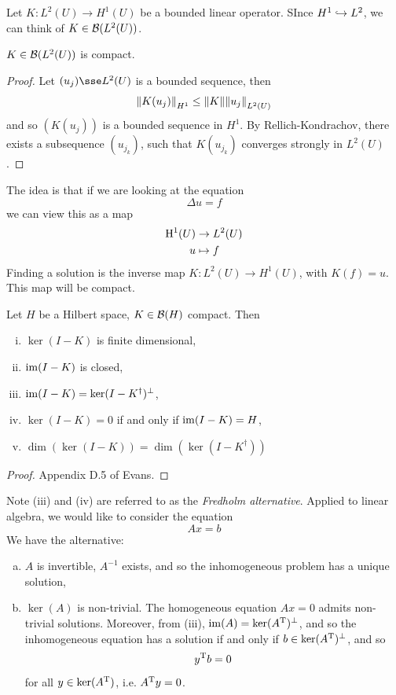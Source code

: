 \documentclass{article}
\begin{document}
\begin{example}
     Let \(K : L^2(U) \to H^1(U)\) be a bounded linear operator. SInce \(H^1 \hookrightarrow L^2\), we can think of \(K \in \mathcal{B}(L^2(U))\).

    \begin{claim}
        \(K \in \mathcal{B}(L^2(U))\) is compact.
    \end{claim}

    \begin{proof}
        Let \((u_j) \sse L^2(U)\) is a bounded sequence, then
        \[\norm{K(u_j)}_{H^1} \le \norm{K}\norm{u_j}_{L^2(U)}\]
        and so \((K(u_j))\) is a bounded sequence in \(H^1\). By Rellich-Kondrachov, there exists a subsequence \((u_{j_k})\), such that \(K(u_{j_k})\) converges strongly in \(L^2(U)\). 
    \end{proof}
\end{example}

The idea is that if we are looking at the equation
\[\Delta u = f\]
we can view this as a map
\begin{align*}
    \mathrm{H}^1(U) &\to L^2(U) \\
    u &\mapsto f
\end{align*}
Finding a solution is the inverse map \(K : L^2(U) \to H^1(U)\), with \(K(f) = u\). This map will be compact.

\begin{theorem}
    Let \(H\) be a Hilbert space, \(K \in \mathcal{B}(H)\) compact. Then
    \begin{enumerate}[(i)]
        \item \(\ker(I - K)\) is finite dimensional,
        \item \(\operatorname{im}(I - K)\) is closed,
        \item \(\operatorname{im}(I - K) = \ker(I - K^\dagger)^\perp\),
        \item \(\ker(I - K) = 0\) if and only if \(\operatorname{im}(I - K) = H\),
        \item \(\dim(\ker(I - K)) = \dim(\ker(I - K^\dagger))\)
    \end{enumerate}
\end{theorem}

\begin{proof}
    Appendix D.5 of Evans.
\end{proof}

Note (iii) and (iv) are referred to as the \emph{Fredholm alternative}. Applied to linear algebra, we would like to consider the equation
\[Ax = b\]
We have the alternative:
\begin{enumerate}[(a)]
    \item \(A\) is invertible, \(A^{-1}\) exists, and so the inhomogeneous problem has a unique solution,
    \item \(\ker(A)\) is non-trivial. The homogeneous equation \(Ax = 0\) admits non-trivial solutions. Moreover, from (iii), \(\operatorname{im}(A) = \ker(A^{\mathrm{T}})^\perp\), and so the inhomogeneous equation has a solution if and only if \(b \in \ker(A^{\mathrm{T}})^\perp\), and so
    \[y^{\mathrm{T}} b = 0\]
    for all \(y \in \ker(A^{\mathrm{T}})\), i.e. \(A^{\mathrm{T}} y = 0\).
\end{enumerate}
\end{document}
